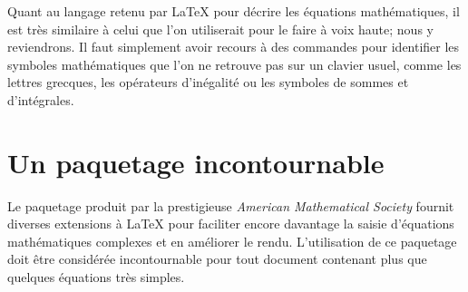 
Quant au langage retenu par {\LaTeX} pour décrire les équations
mathématiques, il est très similaire à celui que l'on utiliserait pour
le faire à voix haute; nous y reviendrons. Il faut simplement avoir
recours à des commandes pour identifier les symboles mathématiques que
l'on ne retrouve pas sur un clavier usuel, comme les lettres grecques,
les opérateurs d'inégalité ou les symboles de sommes et d'intégrales.


\section{Un paquetage incontournable}
\label{sec:math:amsmath}

Le paquetage  produit par la prestigieuse \emph{American
  Mathematical Society} fournit diverses extensions à {\LaTeX} pour
faciliter encore davantage la saisie d'équations mathématiques
complexes et en améliorer le rendu. L'utilisation de ce paquetage doit
être considérée incontournable pour tout document contenant plus que
quelques équations très simples.

